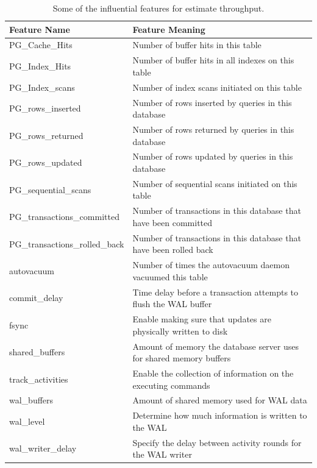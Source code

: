 \begin{table}[h!]
  \centering
  \begin{adjustbox}{max width=0.85\textwidth}
    \begin{tabular}{ll}
      \toprule
      Feature Name                   & Feature Meaning                                                     \\
      \midrule
      PG\_Cache\_Hits                & Number of buffer hits in this table                                 \\
      PG\_Index\_Hits                & Number of buffer hits in all indexes on this table                  \\
      PG\_Index\_scans               & Number of index scans initiated on this
      table                       \\
      PG\_rows\_inserted             & Number of rows inserted by queries in this database                 \\
      PG\_rows\_returned             & Number of rows returned by queries in this database                 \\
      PG\_rows\_updated              & Number of rows updated by queries in this database                  \\
      PG\_sequential\_scans          & Number of sequential scans initiated on this table                  \\
      PG\_transactions\_committed    & Number of transactions in this database that have been committed    \\
      PG\_transactions\_rolled\_back & Number of transactions in this database that have been rolled back  \\
      autovacuum                     & Number of times the autovacuum daemon vacuumed this table           \\
      commit\_delay                  & Time delay before a transaction attempts to flush the WAL buffer    \\
      fsync                          & Enable making sure that updates are physically written to disk      \\
      shared\_buffers                & Amount of memory the database server uses for shared memory buffers \\
      track\_activities              & Enable the collection of information on the executing commands      \\
      wal\_buffers                   & Amount of shared memory used for WAL data                           \\
      wal\_level                     & Determine how much information is written to the WAL                \\
      wal\_writer\_delay             & Specify the delay between activity rounds for the WAL writer        \\
      \bottomrule
    \end{tabular}
  \end{adjustbox}

  \caption{Some of the influential features for estimate throughput.}
  \label{tab:influential_features_for_throughput}
\end{table}

